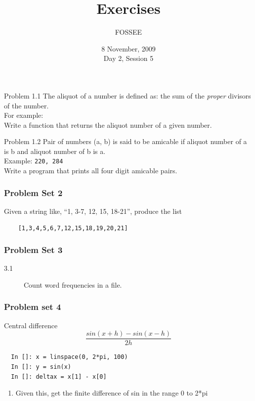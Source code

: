 \documentclass[14pt,compress]{beamer}
\title[Exercises]{Exercises}
\author[FOSSEE] {FOSSEE}
\institute[IIT Bombay] {Department of Aerospace Engineering\\IIT Bombay}
\date[] {8 November, 2009\\Day 2, Session 5}
\newcounter{time}
\newcommand{\inctime}[1]{\addtocounter{time}{#1}{\tiny \thetime\ m}}
\begin{document}
\begin{frame}
  \titlepage
\end{frame}

\begin{frame}{Problem 1.1}
  The aliquot of a number is defined as: the sum of the \emph{proper} divisors of the number. \\For example: 
\\
  Write a function that returns the aliquot number of a given number. 
\end{frame}

\begin{frame}{Problem 1.2}
  Pair of numbers (a, b) is said to be \alert{amicable} if aliquot number of a is b and aliquot number of b is a.\\
  Example: \texttt{220, 284}\\
  Write a program that prints all four digit amicable pairs.
  
\inctime{20}
\end{frame}



\begin{frame}[fragile]
  \frametitle{Problem Set 2}
  Given a string like, ``1, 3-7, 12, 15, 18-21'', produce the list \\
  \begin{lstlisting}
    [1,3,4,5,6,7,12,15,18,19,20,21]
  \end{lstlisting}
\inctime{10}
\end{frame}

\begin{frame} 
  \frametitle{Problem Set 3}
  \begin{description}
    \item[3.1] Count word frequencies in a file.
\end{description}
\inctime{5}
\end{frame}

\begin{frame}[fragile]
  \frametitle{Problem set 4}
  Central difference
  \begin{equation*}
  \frac{sin(x+h)-sin(x-h)}{2h}
  \end{equation*}
  \begin{lstlisting}
  In []: x = linspace(0, 2*pi, 100)
  In []: y = sin(x)
  In []: deltax = x[1] - x[0]
  \end{lstlisting}
  \pause
    \begin{enumerate}
      \item Given this, get the finite difference of sin in the range 0 to 2*pi
    \end{enumerate}
\end{frame}
\end{document}
